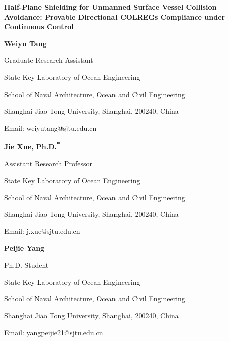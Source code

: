 \documentclass[10pt,letterpaper]{article}
\begin{document}
\linenumbers

\begin{flushleft}
{\bfseries Half-Plane Shielding for Unmanned Surface Vessel Collision Avoidance:
Provable Directional COLREGs Compliance under Continuous Control}\par
\vspace{12pt}

{\bfseries Weiyu Tang}\par
Graduate Research Assistant\par
State Key Laboratory of Ocean Engineering\par
School of Naval Architecture, Ocean and Civil Engineering\par
Shanghai Jiao Tong University, Shanghai, 200240, China\par
Email: weiyutang@sjtu.edu.cn\par
\vspace{12pt}

{\bfseries Jie Xue, Ph.D.\textsuperscript{*}}\par
Assistant Research Professor\par
State Key Laboratory of Ocean Engineering\par
School of Naval Architecture, Ocean and Civil Engineering\par
Shanghai Jiao Tong University, Shanghai, 200240, China\par
Email: j.xue@sjtu.edu.cn\par
\vspace{12pt}

{\bfseries Peijie Yang}\par
Ph.D. Student\par
State Key Laboratory of Ocean Engineering\par
School of Naval Architecture, Ocean and Civil Engineering\par
Shanghai Jiao Tong University, Shanghai, 200240, China\par
Email: yangpeijie21@sjtu.edu.cn\par
\vspace{12pt}


\end{flushleft}
\end{document}

